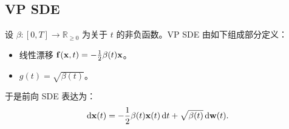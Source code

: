 


\subsection{VP SDE}
设 $\beta\colon [0,T] \rightarrow \mathbb{R}_{\geq 0 }$ 为关于 $t$ 的非负函数。VP SDE 由如下组成部分定义：
\begin{itemize}
    \item {}线性漂移 $\mathbf{f}({\mathbf{x}}, t) = -\frac{1}{2}\beta(t){\mathbf{x}}$。
    \item {}$g(t) = \sqrt{\beta(t)}$。
\end{itemize}
于是前向 SDE 表达为：
\begin{align}\label{eq:forward-linear-sde}
\mathop{}\!\mathrm{d}{\mathbf{x}}(t) = -\frac{1}{2}\beta(t) {\mathbf{x}}(t) \mathop{}\!\mathrm{d} t + \sqrt{\beta(t)} \mathop{}\!\mathrm{d}{\mathbf{w}}(t).
\end{align}


